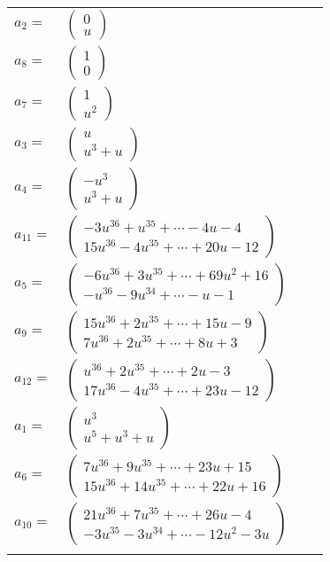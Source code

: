 \documentclass[1p]{elsarticle_modified}
\theoremstyle{definition}
\begin{document}
\begin{tabular}{m{7pt} m{180pt} m{7pt} m{180pt} }
\flushright $a_{2}=$&$\begin{pmatrix}0\\u\end{pmatrix}$ \\
\flushright $a_{8}=$&$\begin{pmatrix}1\\0\end{pmatrix}$ \\
\flushright $a_{7}=$&$\begin{pmatrix}1\\u^2\end{pmatrix}$ \\
\flushright $a_{3}=$&$\begin{pmatrix}u\\u^3+u\end{pmatrix}$ \\
\flushright $a_{4}=$&$\begin{pmatrix}- u^3\\u^3+u\end{pmatrix}$ \\
\flushright $a_{11}=$&$\begin{pmatrix}-3 u^{36}+u^{35}+\cdots-4 u-4\\15 u^{36}-4 u^{35}+\cdots+20 u-12\end{pmatrix}$ \\
\flushright $a_{5}=$&$\begin{pmatrix}-6 u^{36}+3 u^{35}+\cdots+69 u^2+16\\- u^{36}-9 u^{34}+\cdots- u-1\end{pmatrix}$ \\
\flushright $a_{9}=$&$\begin{pmatrix}15 u^{36}+2 u^{35}+\cdots+15 u-9\\7 u^{36}+2 u^{35}+\cdots+8 u+3\end{pmatrix}$ \\
\flushright $a_{12}=$&$\begin{pmatrix}u^{36}+2 u^{35}+\cdots+2 u-3\\17 u^{36}-4 u^{35}+\cdots+23 u-12\end{pmatrix}$ \\
\flushright $a_{1}=$&$\begin{pmatrix}u^3\\u^5+u^3+u\end{pmatrix}$ \\
\flushright $a_{6}=$&$\begin{pmatrix}7 u^{36}+9 u^{35}+\cdots+23 u+15\\15 u^{36}+14 u^{35}+\cdots+22 u+16\end{pmatrix}$ \\
\flushright $a_{10}=$&$\begin{pmatrix}21 u^{36}+7 u^{35}+\cdots+26 u-4\\-3 u^{35}-3 u^{34}+\cdots-12 u^2-3 u\end{pmatrix}$\\&\end{tabular}
\end{document}
